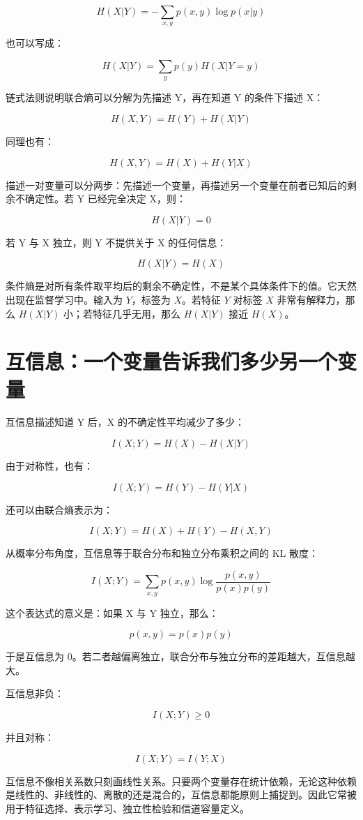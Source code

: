 \[
H(X|Y)=-\sum_{x,y}p(x,y)\log p(x|y)
\]

也可以写成：

\[
H(X|Y)=\sum_{y}p(y)H(X|Y=y)
\]

链式法则说明联合熵可以分解为先描述 Y，再在知道 Y 的条件下描述 X：

\[
H(X,Y)=H(Y)+H(X|Y)
\]

同理也有：

\[
H(X,Y)=H(X)+H(Y|X)
\]

描述一对变量可以分两步：先描述一个变量，再描述另一个变量在前者已知后的剩余不确定性。若 Y 已经完全决定 X，则：

\[
H(X|Y)=0
\]

若 Y 与 X 独立，则 Y 不提供关于 X 的任何信息：

\[
H(X|Y)=H(X)
\]

条件熵是对所有条件取平均后的剩余不确定性，不是某个具体条件下的值。它天然出现在监督学习中。输入为 \(Y\)，标签为 \(X\)。若特征 \(Y\) 对标签 \(X\) 非常有解释力，那么 \(H(X|Y)\) 小；若特征几乎无用，那么 \(H(X|Y)\) 接近 \(H(X)\)。

\section{互信息：一个变量告诉我们多少另一个变量}

互信息描述知道 Y 后，X 的不确定性平均减少了多少：

\[
I(X;Y)=H(X)-H(X|Y)
\]

由于对称性，也有：

\[
I(X;Y)=H(Y)-H(Y|X)
\]

还可以由联合熵表示为：

\[
I(X;Y)=H(X)+H(Y)-H(X,Y)
\]

从概率分布角度，互信息等于联合分布和独立分布乘积之间的 KL 散度：

\[
I(X;Y)=\sum_{x,y}p(x,y)\log\frac{p(x,y)}{p(x)p(y)}
\]

这个表达式的意义是：如果 X 与 Y 独立，那么：

\[
p(x,y)=p(x)p(y)
\]

于是互信息为 0。若二者越偏离独立，联合分布与独立分布的差距越大，互信息越大。

互信息非负：

\[
I(X;Y)\ge 0
\]

并且对称：

\[
I(X;Y)=I(Y;X)
\]

互信息不像相关系数只刻画线性关系。只要两个变量存在统计依赖，无论这种依赖是线性的、非线性的、离散的还是混合的，互信息都能原则上捕捉到。因此它常被用于特征选择、表示学习、独立性检验和信道容量定义。

